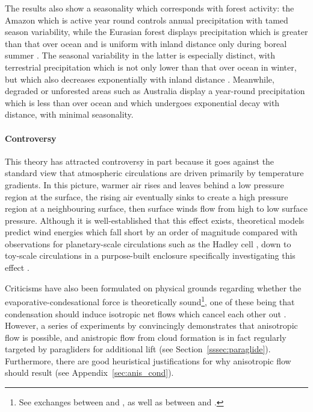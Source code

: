 The results also show a seasonality which corresponds with forest activity: the Amazon which is active year round controls annual precipitation with tamed season variability, while the Eurasian forest displays precipitation which is greater than that over ocean and is uniform with inland distance only during boreal summer \citep{makarieva2013_revisiting}. The seasonal variability in the latter is especially distinct, with terrestrial precipitation which is not only lower than that over ocean in winter, but which also decreases exponentially with inland distance \citep{makarieva2013_revisiting}. Meanwhile, degraded or unforested areas such as Australia display a year-round precipitation which is less than over ocean and which undergoes exponential decay with distance, with minimal seasonality\citep{makarieva2009_evidence, makarieva2013_revisiting}.

\paragraph{Controversy}

This theory has attracted controversy in part because it goes against the standard view that atmospheric circulations are driven primarily by temperature gradients. In this picture, warmer air rises and leaves behind a low pressure region at the surface, the rising air eventually sinks to create a high pressure region at a neighbouring surface, then surface winds flow from high to low surface pressure. Although it is well-established that this effect exists, theoretical models predict wind energies which fall short by an order of magnitude compared with observations for planetary-scale circulations such as the Hadley cell \citep{held1980, schneider2006, caballero2008, makarieva2013}, down to toy-scale circulations in a purpose-built enclosure specifically investigating this effect \citep{bunyard2015, bunyard2017, bunyard2019}.

Criticisms have also been formulated on physical grounds regarding whether the evaporative-condesational force is theoretically sound\footnote{See exchanges between \citet{meesters2009} and \citet{makarieva2009_meesters}, as well as between \citet{jaramillo2018, jaramillo2019} and \citet{makarieva2019_jaramillo}.}, one of these being that condensation should induce isotropic net flows which cancel each other out \citep{bunyard2015, bunyard2017}. However, a series of experiments by \citet{bunyard2015, bunyard2017, bunyard2019} convincingly demonstrates that anisotropic flow is possible, and anistropic flow from cloud formation is in fact regularly targeted by paragliders for additional lift \citep{pagen1992, pagen2001} (see Section~\ref{sssec:paraglide}). Furthermore, there are good heuristical justifications for why anisotropic flow should result (see Appendix~\ref{sec:anis_cond}).

